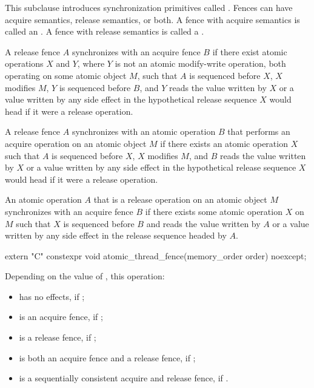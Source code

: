 \pnum
This subclause introduces synchronization primitives called . Fences can have
acquire semantics, release semantics, or both. A fence with acquire semantics is called
an . A fence with release semantics is called a .

\pnum
A release fence $A$ synchronizes with an acquire fence $B$ if there exist
atomic operations $X$ and $Y$,
where $Y$ is not an atomic modify-write operation,
both operating on some atomic object
$M$, such that $A$ is sequenced before $X$, $X$ modifies
$M$, $Y$ is sequenced before $B$, and $Y$ reads the value
written by $X$ or a value written by any side effect in the hypothetical release
sequence $X$ would head if it were a release operation.

\pnum
A release fence $A$ synchronizes with an atomic operation $B$ that
performs an acquire operation on an atomic object $M$ if there exists an atomic
operation $X$ such that $A$ is sequenced before $X$, $X$
modifies $M$, and $B$ reads the value written by $X$ or a value
written by any side effect in the hypothetical release sequence $X$ would head if
it were a release operation.

\pnum
An atomic operation $A$ that is a release operation on an atomic object
$M$ synchronizes with an acquire fence $B$ if there exists some atomic
operation $X$ on $M$ such that $X$ is sequenced before $B$
and reads the value written by $A$ or a value written by any side effect in the
release sequence headed by $A$.

%
\begin{itemdecl}
extern "C" constexpr void atomic_thread_fence(memory_order order) noexcept;
\end{itemdecl}

\begin{itemdescr}
\pnum
\effects
Depending on the value of , this operation:
\begin{itemize}
\item has no effects, if ;

\item is an acquire fence, if ;

\item is a release fence, if ;

\item is both an acquire fence and a release fence, if ;

\item is a sequentially consistent acquire and release fence, if .
\end{itemize}
\end{itemdescr}

